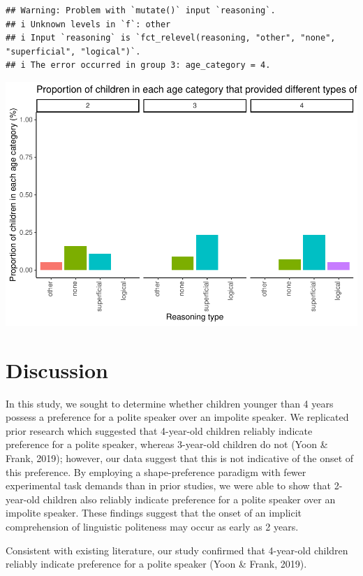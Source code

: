 \documentclass[
  english,
  man,floatsintext]{apa6}
\begin{document}
\begin{verbatim}
## Warning: Problem with `mutate()` input `reasoning`.
## i Unknown levels in `f`: other
## i Input `reasoning` is `fct_relevel(reasoning, "other", "none", "superficial", "logical")`.
## i The error occurred in group 3: age_category = 4.
\end{verbatim}

\includegraphics{writeup_files/figure-latex/unnamed-chunk-3-1.pdf}

\hypertarget{discussion}{%
\section{Discussion}\label{discussion}}

In this study, we sought to determine whether children younger than 4 years possess a preference for a polite speaker over an impolite speaker. We replicated prior research which suggested that 4-year-old children reliably indicate preference for a polite speaker, whereas 3-year-old children do not (Yoon \& Frank, 2019); however, our data suggest that this is not indicative of the onset of this preference. By employing a shape-preference paradigm with fewer experimental task demands than in prior studies, we were able to show that 2-year-old children also reliably indicate preference for a polite speaker over an impolite speaker. These findings suggest that the onset of an implicit comprehension of linguistic politeness may occur as early as 2 years.

Consistent with existing literature, our study confirmed that 4-year-old children reliably indicate preference for a polite speaker (Yoon \& Frank, 2019).
\end{document}
